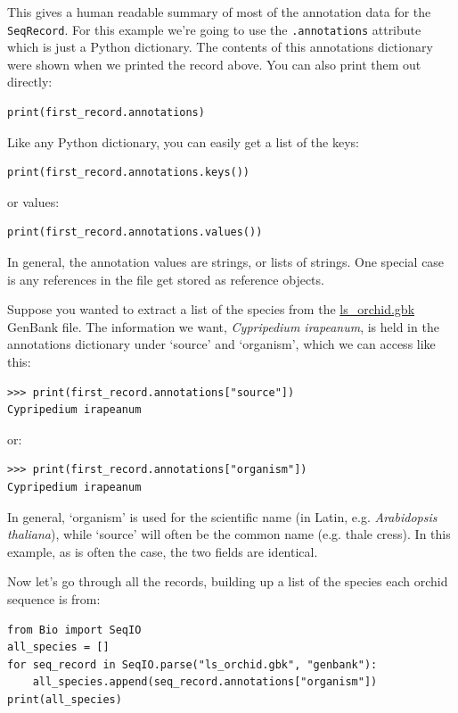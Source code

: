 \documentclass{report}
\begin{document}
This gives a human readable summary of most of the annotation data for the \verb|SeqRecord|.
For this example we're going to use the \verb|.annotations| attribute which is just a Python dictionary.
The contents of this annotations dictionary were shown when we printed the record above.
You can also print them out directly:
\begin{verbatim}
print(first_record.annotations)
\end{verbatim}
\noindent Like any Python dictionary, you can easily get a list of the keys:
\begin{verbatim}
print(first_record.annotations.keys())
\end{verbatim}
\noindent or values:
\begin{verbatim}
print(first_record.annotations.values())
\end{verbatim}

In general, the annotation values are strings, or lists of strings.  One special case is any references in the file get stored as reference objects.  

Suppose you wanted to extract a list of the species from the \href{http://biopython.org/DIST/docs/tutorial/examples/ls_orchid.gbk}{ls\_orchid.gbk} GenBank file.  The information we want, \emph{Cypripedium irapeanum}, is held in the annotations dictionary under `source' and `organism', which we can access like this:

\begin{verbatim}
>>> print(first_record.annotations["source"])
Cypripedium irapeanum
\end{verbatim}

\noindent or:

\begin{verbatim}
>>> print(first_record.annotations["organism"])
Cypripedium irapeanum
\end{verbatim}

In general, `organism' is used for the scientific name (in Latin, e.g. \textit{Arabidopsis thaliana}),
while `source' will often be the common name (e.g. thale cress).  In this example, as is often the case,
the two fields are identical.  

Now let's go through all the records, building up a list of the species each orchid sequence is from:

\begin{verbatim}
from Bio import SeqIO
all_species = []
for seq_record in SeqIO.parse("ls_orchid.gbk", "genbank"):
    all_species.append(seq_record.annotations["organism"])
print(all_species)
\end{verbatim}
\end{document}
